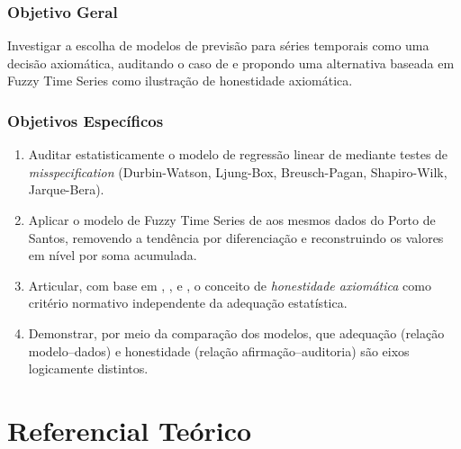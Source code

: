 \documentclass[
    12pt,
    oneside,
    openany,
    a4paper,
    english,
    brazil
]{abntex2}
\theoremstyle{definition}
\begin{document}
\subsection{Objetivo Geral}
\label{subsec:objetivo-geral}

Investigar a escolha de modelos de previsão para séries temporais como uma decisão axiomática, auditando o caso de  e propondo uma alternativa baseada em Fuzzy Time Series como ilustração de honestidade axiomática.

\subsection{Objetivos Específicos}
\label{subsec:objetivos-especificos}

\begin{enumerate}
    \item Auditar estatisticamente o modelo de regressão linear de  mediante testes de \textit{misspecification} (Durbin-Watson, Ljung-Box, Breusch-Pagan, Shapiro-Wilk, Jarque-Bera).
    \item Aplicar o modelo de Fuzzy Time Series de  aos mesmos dados do Porto de Santos, removendo a tendência por diferenciação e reconstruindo os valores em nível por soma acumulada.
    \item Articular, com base em , ,  e , o conceito de \textit{honestidade axiomática} como critério normativo independente da adequação estatística.
    \item Demonstrar, por meio da comparação dos modelos, que adequação (relação modelo--dados) e honestidade (relação afirmação--auditoria) são eixos logicamente distintos.
\end{enumerate}

\chapter{Referencial Teórico}
\label{cap:referencial}

\end{document}
